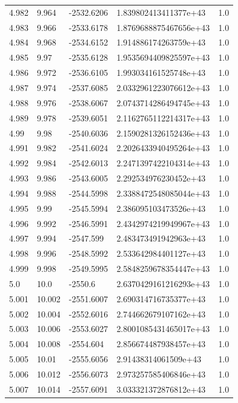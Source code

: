 \begin{tabular}{lllll}
4.982 & 9.964 & -2532.6206 & 1.839802413411377e+43 & 1.0 \\
4.983 & 9.966 & -2533.6178 & 1.8769688875467656e+43 & 1.0 \\
4.984 & 9.968 & -2534.6152 & 1.914886174263759e+43 & 1.0 \\
4.985 & 9.97 & -2535.6128 & 1.9535694409825597e+43 & 1.0 \\
4.986 & 9.972 & -2536.6105 & 1.993034161525748e+43 & 1.0 \\
4.987 & 9.974 & -2537.6085 & 2.0332961223076612e+43 & 1.0 \\
4.988 & 9.976 & -2538.6067 & 2.0743714286494745e+43 & 1.0 \\
4.989 & 9.978 & -2539.6051 & 2.1162765112214317e+43 & 1.0 \\
4.99 & 9.98 & -2540.6036 & 2.1590281326152436e+43 & 1.0 \\
4.991 & 9.982 & -2541.6024 & 2.2026433940495264e+43 & 1.0 \\
4.992 & 9.984 & -2542.6013 & 2.2471397422104314e+43 & 1.0 \\
4.993 & 9.986 & -2543.6005 & 2.292534976230452e+43 & 1.0 \\
4.994 & 9.988 & -2544.5998 & 2.3388472548085044e+43 & 1.0 \\
4.995 & 9.99 & -2545.5994 & 2.386095103473526e+43 & 1.0 \\
4.996 & 9.992 & -2546.5991 & 2.4342974219949967e+43 & 1.0 \\
4.997 & 9.994 & -2547.599 & 2.483473491942963e+43 & 1.0 \\
4.998 & 9.996 & -2548.5992 & 2.533642984401127e+43 & 1.0 \\
4.999 & 9.998 & -2549.5995 & 2.5848259678354447e+43 & 1.0 \\
5.0 & 10.0 & -2550.6 & 2.6370429161216293e+43 & 1.0 \\
5.001 & 10.002 & -2551.6007 & 2.690314716735377e+43 & 1.0 \\
5.002 & 10.004 & -2552.6016 & 2.744662679107162e+43 & 1.0 \\
5.003 & 10.006 & -2553.6027 & 2.8001085431465017e+43 & 1.0 \\
5.004 & 10.008 & -2554.604 & 2.856674487938457e+43 & 1.0 \\
5.005 & 10.01 & -2555.6056 & 2.91438314061509e+43 & 1.0 \\
5.006 & 10.012 & -2556.6073 & 2.973257585406846e+43 & 1.0 \\
5.007 & 10.014 & -2557.6091 & 3.033321372876812e+43 & 1.0 \\

\end{tabular}
